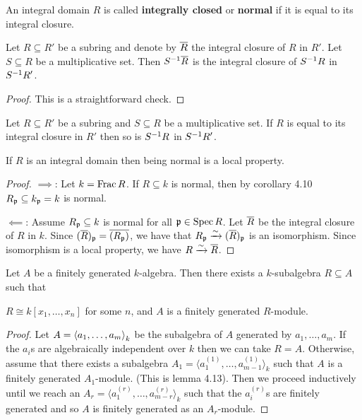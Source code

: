 \begin{defn}[4.8]
  An integral domain $R$ is called \textbf{integrally closed} or \textbf{normal} if it is equal to its integral closure.
\end{defn}

\begin{prop}[4.9]
  Let $R \subseteq R'$ be a subring and denote by $\overline R$ the integral closure of $R$ in $R'$.
  Let $S \subseteq R$ be a multiplicative set.
  Then $S^{-1}\overline R$ is the integral closure of $S^{-1} R$ in $S^{-1} R'$.
\end{prop}

\begin{proof}
  This is a straightforward check.
\end{proof}

\begin{cor}[4.10]
  Let $R \subseteq R'$ be a subring and $S \subseteq R$ be a multiplicative set.
  If $R$ is equal to its integral closure in $R'$ then so is $S^{-1} R$ in $S^{-1} R'$.
\end{cor}

\begin{prop}[4.11]
  If $R$ is an integral domain then being normal is a local property.
\end{prop}

\begin{proof}
  $\implies$:
  Let $k = \operatorname{Frac} R$.
  If $R \subseteq k$ is normal, then by corollary 4.10 $R_{\mathfrak{p}} \subseteq k_{\mathfrak{p}}=k$ is normal.
  
  $\impliedby$:
  Assume $R_{\mathfrak{p}} \subseteq k$ is normal for all $\mathfrak{p} \in \operatorname{Spec} R$.
  Let $\overline R$ be the integral closure of $R$ in $k$.
  Since $(\overline R)_{\mathfrak{p}} = \overline{(R_{\mathfrak{p}})}$, we have that $R_{\mathfrak{p}} \xrightarrow{\sim} (\overline R)_{\mathfrak{p}}$ is an isomorphism.
  Since isomorphism is a local property, we have $R \xrightarrow{\sim} \overline R$.
\end{proof}

\begin{thm}
  Let $A$ be a finitely generated $k$-algebra.
  Then there exists a $k$-subalgebra $R \subseteq A$ such that
  \begin{enum}
    \io $R \cong k[x_1,\ldots,x_n]$ for some $n$, and
    \io $A$ is a finitely generated $R$-module.
  \end{enum}
\end{thm}

\begin{proof}
  Let $A={\left\langle a_1,\ldots,a_m \right\rangle}_k$ be the subalgebra of $A$ generated by $a_1,\ldots,a_m$.
  If the $a_i$s are algebraically independent over $k$ then we can take $R=A$.
  Otherwise, assume that there exists a subalgebra $A_1=\langle a_1^{(1)},\ldots,a_{m-1}^{(1)} \rangle_k$ such that $A$ is a finitely generated $A_1$-module.
  (This is lemma 4.13).
  Then we proceed inductively until we reach an $A_r=\langle a_1^{(r)},\ldots,a_{m-r}^{(r)} \rangle_k$ such that the $a_i^{(r)}$s are finitely generated and so $A$ is finitely generated as an $A_r$-module.
\end{proof}

